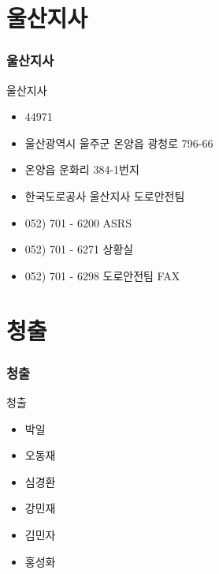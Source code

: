 \documentclass[aspectratio=1610,20pt,xcolor=pdftex,dvipsnames,table,handout]{beamer}
\begin{document}
		\section{울산지사}
		\begin{frame} [t,plain]
		\frametitle{울산지사}
			\begin{block} {울산지사}
			\setlength{\leftmargini}{2em}			
			\begin{itemize}
				\item 44971
				\item 울산광역시 울주군 온양읍 광청로 796-66
				\item 온양읍 운화리 384-1번지
				\item 한국도로공사 울산지사 도로안전팀 \\
						\hrulefill
				\item 052) 701 - 6200 ASRS
				\item 052) 701 - 6271 상황실
				\item 052) 701 - 6298 도로안전팀 FAX \\
						\hrulefill

			\end{itemize}
			\end{block}						

		\end{frame}						
		

		\section{청출}
		\begin{frame} [t,plain]
		\frametitle{청출}
			\begin{block} {청출}
			\setlength{\leftmargini}{1em}			
			\begin{itemize}
				\item 박일 \quad \hrulefill
				\item 오동재		\quad \hrulefill
				\item 심경환		\quad \hrulefill
				\item 강민재		\quad \hrulefill
				\item 김민자		\quad \hrulefill
				\item 홍성화		\quad \hrulefill

			\end{itemize}
			\end{block}			

								
		\end{frame}						
	
\end{document}
